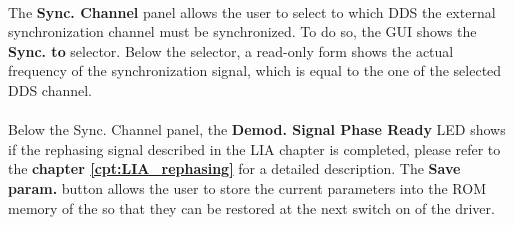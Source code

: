 \paragraph{}The \textbf{Sync. Channel} panel allows the user to select to which DDS the external synchronization channel must be synchronized. To do so, the GUI shows the \textbf{Sync. to} selector. Below the selector, a read-only form shows the actual frequency of the synchronization signal, which is equal to the one of the selected DDS channel.

\paragraph{}Below the Sync. Channel panel, the \textbf{Demod. Signal Phase Ready} LED shows if the rephasing signal described in the LIA chapter is completed, please refer to the \textbf{chapter \ref{cpt:LIA_rephasing}} for a detailed description. 
\newline The \textbf{Save param.} button allows the user to store the current parameters into the ROM memory of the \QubeModel so that they can be restored at the next switch on of the driver.

\newpage





